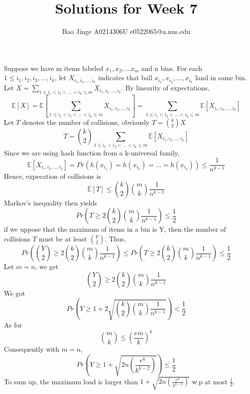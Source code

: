 \documentclass{article}
\author{Bao Jinge A0214306U e0522065@u.nus.edu}
\title{Solutions for Week 7}
\date{}
\begin{document}
	\maketitle
	\section{}
	Suppose we have m items labeled $x_1, x_2, ... x_m$ and n bins. For each $1 \leq i_1, i_2, i_3,...,i_k$, let $X_{i_1,i_2,...,i_k}$ indicates that ball $x_{i_1}, x_{i_2},...,x_{i_k}$ land in same bin.\\
	Let $X=\sum_{1\leq i_1<i_2<...<i_k \leq m}X_{i_1,i_2,...,i_k}$. By linearity of expectations,
	$$
	\mathbb{E}[X] = \mathbb{E}[\sum_{1\leq i_1<i_2<...<i_k \leq m}X_{i_1,i_2,...,i_k}]=\sum_{1\leq i_1<i_2<...<i_k \leq m}\mathbb{E}[X_{i_1,i_2,...,i_k}]
	$$
	Let $T$ denotes the number of collisions, obviously $T=\binom{k}{2}X$
	$$
	T = \binom{k}{2}\sum_{1\leq i_1<i_2<...<i_k \leq m}\mathbb{E}[X_{i_1,i_2,...,i_k}]
	$$
	Since we are using hash function from a k-universal family,
	$$
	\mathbb{E}[X_{i_1,i_2,...,i_k}]=Pr(h(x_{i_1})=h(x_{i_2})=...=h(x_{i_k})) \leq \frac{1}{n^{k-1}}
	$$
	Hence, expecation of collisions is 
	$$
	\mathbb{E}[T] \leq \binom{k}{2}\binom{m}{k}\frac{1}{n^{k-1}}
	$$
	Markov's inequality then yields
	$$
	Pr({T \geq 2\binom{k}{2}\binom{m}{k}\frac{1}{n^{k-1}}}) \leq \frac{1}{2}
	$$
	if we uppose that the maximum of items in a bin is Y, then the number of collisions $T$ must be at least $\binom{Y}{2}$. Thus,
	$$
	Pr(\binom{Y}{2} \geq 2\binom{k}{2}\binom{m}{k}\frac{1}{n^{k-1}}) \leq Pr(T \geq 2\binom{k}{2}\binom{m}{k}\frac{1}{n^{k-1}}) \leq \frac{1}{2}
	$$
	Let $m=n$, we get
	$$
	\binom{Y}{2} \geq 2\binom{k}{2}\binom{m}{k}\frac{1}{n^{k-1}}
	$$
	We got
	$$
	Pr( Y \geq 1+2\sqrt{\binom{k}{2}\binom{m}{k}\frac{1}{n^{k-1}}} ) < \frac{1}{2}
	$$
	As for
	$$
	\binom{m}{k} \leq (\frac{em}{k})^k
	$$
	Consequently with $m=n$,
	$$
	Pr(Y \geq 1+\sqrt{2n(\frac{e^k}{k^{k-2}})}) \leq \frac{1}{2}
	$$
	To sum up, the maximum load is larger than $1+\sqrt{2n(\frac{e^k}{k^{k-2}})}$ w.p at most $\frac{1}{2}$.
\end{document}
